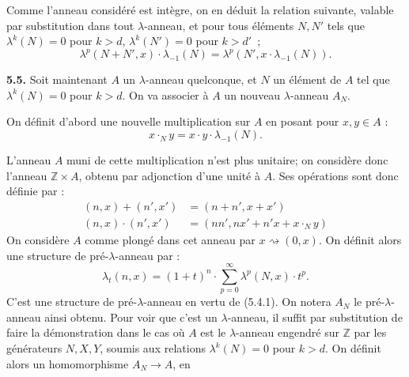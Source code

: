 
Comme l'anneau considéré est intègre, on en déduit la relation suivante, valable par substitution dans tout \(\lambda\)-anneau, et pour tous éléments \(N,N'\) tels que \(\lambda^k(N)=0\) pour \(k>d\), \(\lambda^k(N')=0\) pour \(k>d'\)~;
\begin{equation}\tag{5.4.2}
  \lambda^p(N+N',x)\cdot\lambda_{-1}(N)=\lambda^p(N',x\cdot\lambda_{-1}(N)).
\end{equation}


\textbf{5.5.} Soit maintenant \(A\) un \(\lambda\)-anneau quelconque, et \(N\) un élément de \(A\) tel que \(\lambda^k(N)=0\) pour \(k>d\). On va associer à \(A\) un nouveau \(\lambda\)-anneau \(A_N\).

On définit d'abord une nouvelle multiplication sur \(A\) en posant pour \(x,y\in A\) :
\begin{equation}\tag{5.5.1}
  x\cdot_N y=x\cdot y\cdot\lambda_{-1}(N).
\end{equation}

L'anneau \(A\) muni de cette multiplication n'est plus unitaire; on considère donc l'anneau \(\mathbb Z\times A\), obtenu par adjonction d'une unité à \(A\). Ses opérations sont donc définie par :
\begin{equation}\tag{5.5.2}
\begin{aligned}
  (n,x)+(n',x')&=(n+n',x+x')\\
  (n,x)\cdot(n',x')&=(nn',nx'+n'x+x\cdot_N y)
\end{aligned}
\end{equation}
On considère \(A\) comme plongé dans cet anneau par \(x\rightsquigarrow(0,x)\). On définit alors une structure de pré-\(\lambda\)-anneau par :
\begin{equation}\tag{5.5.3}
  \lambda_t(n,x)=(1+t)^n\cdot\sum_{p=0}^{\infty}\lambda^p(N,x)\cdot t^p.
\end{equation}
C'est une structure de pré-\(\lambda\)-anneau en vertu de (5.4.1). On notera \(A_N\) le pré-\(\lambda\)-anneau ainsi obtenu. Pour voir que c'est un \(\lambda\)-anneau, il suffit par substitution de faire la démonstration dans le cas où \(A\) est le \(\lambda\)-anneau engendré sur \(\mathbb Z\) par les générateurs \(N,X,Y\), soumis aux relations \(\lambda^k(N)=0\) pour \(k>d\). On définit alors un homomorphisme \(A_N\to A\), en
